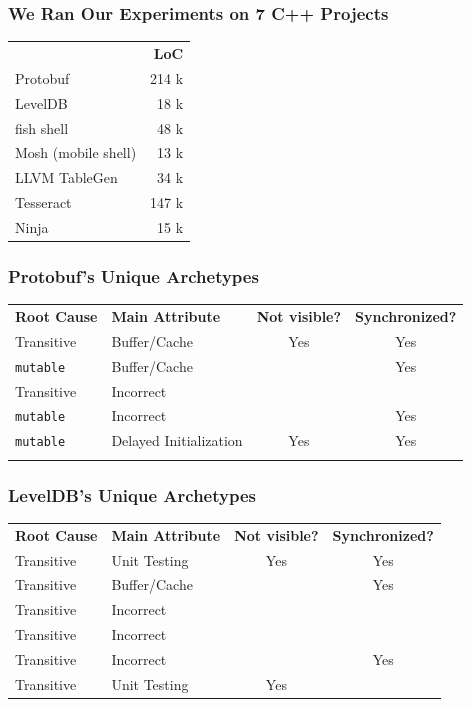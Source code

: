 \documentclass[aspectratio=169]{beamer}
\begin{document}
  \begin{frame}
    \frametitle{We Ran Our Experiments on 7 C++ Projects}
    \Large
    \centering
    \begin{tabular}{l r}
      & \textbf{LoC} \\

      Protobuf & 214 k\\
      LevelDB & 18 k \\
      fish shell & 48 k \\
      Mosh (mobile shell) & 13 k \\
      LLVM TableGen & 34 k \\
      Tesseract & 147 k \\
      Ninja & 15 k \\
    \end{tabular}
  \end{frame}

  \begin{frame}
    \frametitle{Protobuf's Unique Archetypes}
    \Large
    \begin{tabular}{p{2.65cm} p{4cm} c c}
      \textbf{Root Cause} & \textbf{Main Attribute}
      & \textbf{Not visible?} & \textbf{Synchronized?} \\

      Transitive & Buffer/Cache & Yes & Yes \\
      \texttt{mutable} & Buffer/Cache &   & Yes \\
      Transitive & Incorrect &   &   \\
      \texttt{mutable} & Incorrect &   & Yes \\
      \texttt{mutable} & Delayed Initialization & Yes & Yes \\
      & & & \\
    \end{tabular}
  \end{frame}

  \begin{frame}
    \frametitle{LevelDB's Unique Archetypes}
    \Large
    \begin{tabular}{p{2.65cm} p{4cm} c c}
      \textbf{Root Cause} & \textbf{Main Attribute}
      & \textbf{Not visible?} & \textbf{Synchronized?} \\

      Transitive & Unit Testing & Yes & Yes \\
      Transitive & Buffer/Cache &   & Yes \\
      Transitive & Incorrect &   &   \\
      Transitive & Incorrect &   &   \\
      Transitive & Incorrect &   & Yes \\
      Transitive & Unit Testing & Yes &   \\
    \end{tabular}
  \end{frame}
\end{document}
